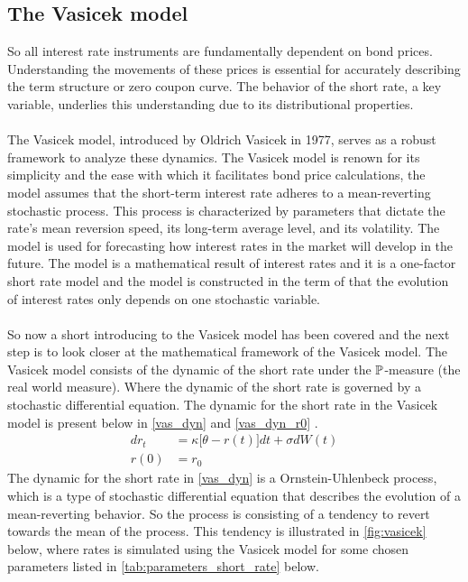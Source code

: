 \subsection{The Vasicek model}
So all interest rate instruments are fundamentally dependent on bond prices. Understanding the movements of 
these prices is essential for accurately describing the term structure or zero coupon curve. The behavior 
of the short rate, a key variable, underlies this understanding due to its distributional properties.
\\\\
The Vasicek model, introduced by Oldrich Vasicek in 1977, serves as a robust framework to analyze these dynamics.
The Vasicek model is renown for its simplicity and the ease with which it facilitates bond price calculations, 
the model assumes that the short-term interest rate adheres to a mean-reverting stochastic process. This process is characterized 
by parameters that dictate the rate's mean reversion speed, its long-term average level, and its volatility.
The model is used for forecasting how interest rates in the market will develop in the future. The model is a
mathematical result of interest rates and it is a one-factor short rate model and the model is constructed in the 
term of that the evolution of interest rates only depends on one stochastic variable.
\\\\
So now a short introducing to the Vasicek model has been covered and the next step is to look closer at the 
mathematical framework of the Vasicek model. The Vasicek model consists of the dynamic of the short rate under the $\mathbb{P}$-measure
(the real world measure). Where the dynamic of the short rate is governed by a stochastic differential equation. 
The dynamic for the short rate in the Vasicek model is present below in \autoref{vas_dyn} and \autoref{vas_dyn_r0} \cite{Bjork}.
\begin{align}
    d r_t &= \kappa \Big[\theta -r(t)\Big] dt + \sigma d W(t) \label{vas_dyn}\\
    r(0) &= r_0 \label{vas_dyn_r0}
\end{align}
The dynamic for the short rate in \autoref{vas_dyn} is a Ornstein-Uhlenbeck process, which is a type of stochastic 
differential equation that describes the evolution of a mean-reverting behavior. So the process is consisting of a 
tendency to revert towards the mean of the process. This tendency is illustrated in \autoref{fig:vasicek} below, where 
 rates is simulated using the Vasicek model for some chosen parameters listed in \autoref{tab:parameters_short_rate} below. 

